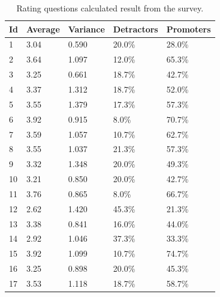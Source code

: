 \documentclass[a4paper,12pt]{article}
\begin{document}
    \begin{table}[!htbp]
        \begin{center}
            \begin{tabularx}{\textwidth}{lllll}
                \toprule
                Id & Average & Variance & Detractors & Promoters \\
                \midrule
                1  & 3.04    & 0.590    & 20.0\%     & 28.0\%    \\
                2  & 3.64    & 1.097    & 12.0\%     & 65.3\%    \\
                3  & 3.25    & 0.661    & 18.7\%     & 42.7\%    \\
                4  & 3.37    & 1.312    & 18.7\%     & 52.0\%    \\
                5  & 3.55    & 1.379    & 17.3\%     & 57.3\%    \\
                6  & 3.92    & 0.915    & 8.0\%      & 70.7\%    \\
                7  & 3.59    & 1.057    & 10.7\%     & 62.7\%    \\
                8  & 3.55    & 1.037    & 21.3\%     & 57.3\%    \\
                9  & 3.32    & 1.348    & 20.0\%     & 49.3\%    \\
                10 & 3.21    & 0.850    & 20.0\%     & 42.7\%    \\
                11 & 3.76    & 0.865    & 8.0\%      & 66.7\%    \\
                12 & 2.62    & 1.420    & 45.3\%     & 21.3\%    \\
                13 & 3.38    & 0.841    & 16.0\%     & 44.0\%    \\
                14 & 2.92    & 1.046    & 37.3\%     & 33.3\%    \\
                15 & 3.92    & 1.099    & 10.7\%     & 74.7\%    \\
                16 & 3.25    & 0.898    & 20.0\%     & 45.3\%    \\
                17 & 3.53    & 1.118    & 18.7\%     & 58.7\%    \\
                \bottomrule
            \end{tabularx}
        \end{center}
        \caption{\label{tab:ratingquestionresultstable} Rating questions calculated result from the survey.}
    \end{table}
\end{document}
